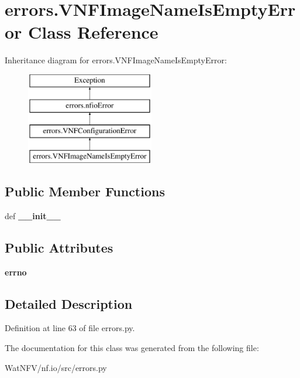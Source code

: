 \hypertarget{classerrors_1_1VNFImageNameIsEmptyError}{\section{errors.\-V\-N\-F\-Image\-Name\-Is\-Empty\-Error Class Reference}
\label{classerrors_1_1VNFImageNameIsEmptyError}
}
Inheritance diagram for errors.\-V\-N\-F\-Image\-Name\-Is\-Empty\-Error\-:\begin{figure}[H]
\begin{center}
\leavevmode
\includegraphics[height=4.000000cm]{classerrors_1_1VNFImageNameIsEmptyError}
\end{center}
\end{figure}
\subsection*{Public Member Functions}
\begin{DoxyCompactItemize}
\item 
\hypertarget{classerrors_1_1VNFImageNameIsEmptyError_a58a6d457d974dd896fa1d9f3db0392ed}{def {\bfseries \-\_\-\-\_\-init\-\_\-\-\_\-}}\label{classerrors_1_1VNFImageNameIsEmptyError_a58a6d457d974dd896fa1d9f3db0392ed}

\end{DoxyCompactItemize}
\subsection*{Public Attributes}
\begin{DoxyCompactItemize}
\item 
\hypertarget{classerrors_1_1VNFImageNameIsEmptyError_a51eb42467bf171acfba9c993e378580b}{{\bfseries errno}}\label{classerrors_1_1VNFImageNameIsEmptyError_a51eb42467bf171acfba9c993e378580b}

\end{DoxyCompactItemize}


\subsection{Detailed Description}


Definition at line 63 of file errors.\-py.



The documentation for this class was generated from the following file\-:\begin{DoxyCompactItemize}
\item 
Wat\-N\-F\-V/nf.\-io/src/errors.\-py\end{DoxyCompactItemize}
